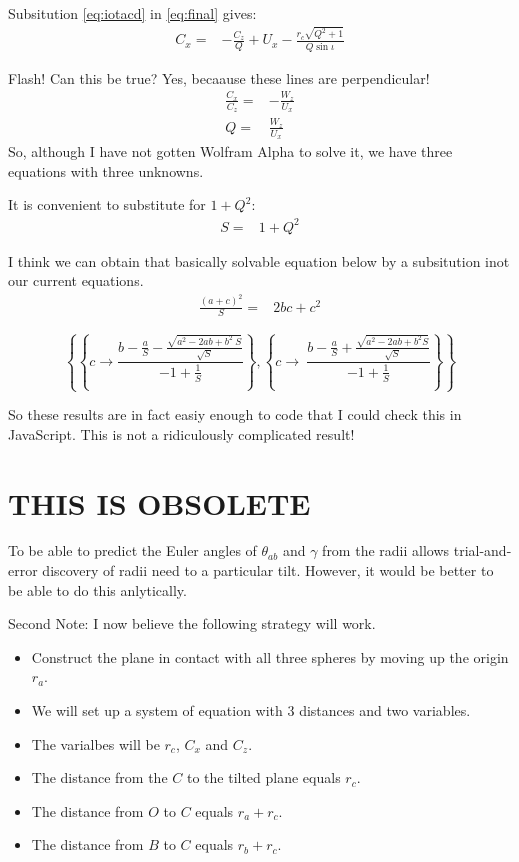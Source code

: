 \documentclass{article}
\begin{document}
Subsitution \ref{eq:iotacd} in \ref{eq:final} gives:
\begin{align}
  C_x =& -\frac{C_z}{Q} + U_x - \frac{r_c \sqrt{Q^2+1}}{Q\sin{\iota}} \label{eq:final}
\end{align}

Flash! Can this be true? Yes, becaause these lines are perpendicular!
\begin{align}
  \frac{C_x}{C_z} =& -\frac{W_z}{U_x} \\
  Q =& \frac{W_z}{U_x}
\end{align}
So, although I have not gotten Wolfram Alpha to solve it, we have three equations
with three unknowns.

It is convenient to substitute for $1+Q^2$:
\begin{align}
  S =& 1 + Q^2
\end{align}

I think we can obtain that basically solvable equation below
by a subsitution inot our current equations.
\begin{align}
  \frac{(a+c)^2}{S} =& 2bc + c^2
  \end{align}

   \[\left\{\left\{c\to \frac{b-\frac{a}{S}-\frac{\sqrt{a^2-2 a b+b^2 \
S}}{\sqrt{S}}}{-1+\frac{1}{S}}\right\},\left\{c\to \
\frac{b-\frac{a}{S}+\frac{\sqrt{a^2-2
      a b+b^2 S}}{\sqrt{S}}}{-1+\frac{1}{S}}\right\}\right\}\]



So these results are in fact easiy enough to code that I could
check this in JavaScript. This is not a ridiculously complicated result!




\section{THIS IS OBSOLETE}


To be able to predict the Euler angles of $\theta_{ab}$ and $\gamma$ from the radii allows trial-and-error
discovery of radii need to a particular tilt.  However, it would be better to be able to do this
anlytically.


Second Note: I now believe the following strategy will work.
\begin{itemize}
\item Construct the plane in contact with all three spheres
  by
  moving up the origin $r_a$.
\item We will set up a system of equation with 3 distances
  and two variables.
\item The varialbes will be $r_c$, $C_x$ and $C_z$.
\item The distance from the $C$ to the tilted plane equals $r_c$.
\item The distance from $O$ to $C$ equals $r_a + r_c$.
  \item The distance from $B$ to $C$ equals $r_b+r_c$.
\end{itemize}
\end{document}
